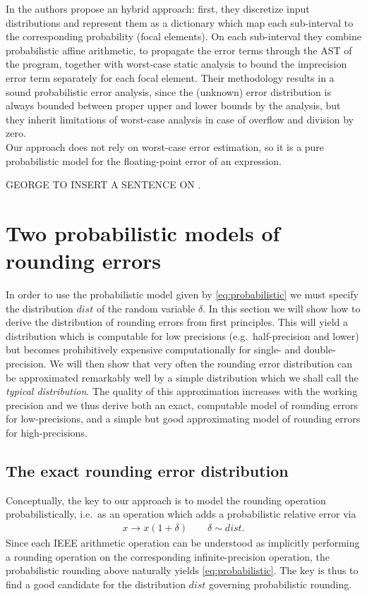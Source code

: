 \documentclass[10pt,conference]{IEEEtran}
\newcommand{\ie}{i.e.\ }
\newcommand{\eg}{e.g.\ }
\begin{document}
In \cite{probdaisy} the authors propose an hybrid approach: first, they
discretize input distributions and represent them as a dictionary which map each sub-interval to the corresponding probability (focal elements). On each sub-interval they combine probabilistic affine arithmetic, to propagate the error terms through the AST of the program, together with worst-case static analysis to bound the imprecision error term separately for each focal element. Their methodology results in a sound probabilistic error analysis, since the (unknown) error distribution is always bounded between proper upper and lower bounds by the analysis, but they inherit limitations of worst-case analysis in case of overflow and division by zero.\\
Our approach does not rely on worst-case error estimation, so it is a pure probabilistic model for the floating-point error of an expression.

GEORGE TO INSERT A SENTENCE ON \cite{constantinides2007synthesis}.

\section{Two probabilistic models of rounding errors}\label{sec:rounding}

In order to use the probabilistic model given by \cref{eq:probabilistic} we must specify the distribution $dist$ of the random variable $\delta$. In this section we will show how to derive the distribution of rounding errors from first principles. This will yield a distribution which is computable for low precisions (\eg half-precision and lower) but becomes prohibitively expensive computationally for single- and double-precision. We will then show that very often the rounding error distribution can be approximated remarkably well by a simple distribution which we shall call the \emph{typical distribution}. The quality of this approximation increases with the working precision and we thus derive both an exact, computable model of rounding errors for low-precisions, and a simple but good approximating model of rounding errors for high-precisions.

\subsection{The exact rounding error distribution}\label{subsec:error_dist}

Conceptually, the key to our approach is to model the rounding operation probabilistically, \ie as an operation which adds a probabilistic relative error via
\begin{align}
x \longrightarrow x(1+\delta)\qquad \delta\sim dist.\label{eq:rounding}
\end{align}
Since each IEEE arithmetic operation can be understood as implicitly performing a rounding operation on the corresponding infinite-precision operation, the probabilistic rounding above naturally yields \cref{eq:probabilistic}. The key is thus to find a good candidate for the distribution $dist$ governing probabilistic rounding.
\end{document}
